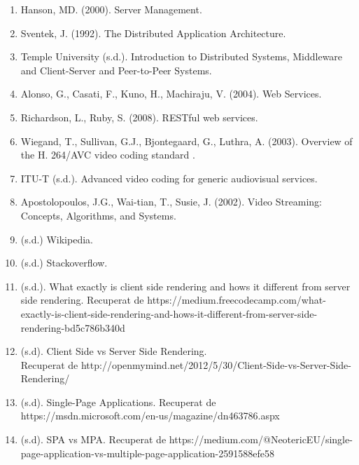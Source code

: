 \documentclass[12pt, titlepage]{article}
\begin{document}
\begin{enumerate}

\item Hanson, MD. (2000). Server Management.

\item Sventek, J. (1992). The Distributed Application Architecture.

\item Temple University (s.d.). Introduction to Distributed Systems, Middleware and Client-Server and Peer-to-Peer Systems.

\item Alonso, G., Casati, F., Kuno, H., Machiraju, V. (2004). Web Services.

\item Richardson, L., Ruby, S. (2008). RESTful web services.

\item Wiegand, T., Sullivan, G.J., Bjontegaard, G., Luthra, A. (2003). Overview of the H. 264/AVC video coding standard  .

\item ITU-T (s.d.). Advanced video coding for generic audiovisual services.

\item Apostolopoulos, J.G., Wai-tian, T., Susie, J. (2002). Video Streaming: Concepts, Algorithms, and Systems.

\item (s.d.) Wikipedia.

\item (s.d.) Stackoverflow.

\item (s.d.). What exactly is client side rendering and hows it different from server side rendering. Recuperat de https://medium.freecodecamp.com/what-exactly-is-client-side-rendering-and-hows-it-different-from-server-side-rendering-bd5c786b340d

\item (s.d). Client Side vs Server Side Rendering. \\ Recuperat de http://openmymind.net/2012/5/30/Client-Side-vs-Server-Side-Rendering/

\item (s.d). Single-Page Applications. Recuperat de https://msdn.microsoft.com/en-us/magazine/dn463786.aspx

\item (s.d). SPA vs MPA. Recuperat de https://medium.com/@NeotericEU/single-page-application-vs-multiple-page-application-2591588efe58


\end{enumerate}
\end{document}
